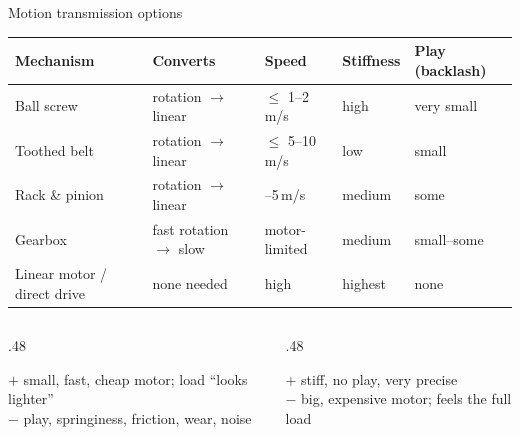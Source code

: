 \documentclass[aspectratio=169,10pt]{beamer}
\begin{document}
\begin{frame}{Motion transmission options}
\centering
\small
\renewcommand{\arraystretch}{1.12}
\begin{tabularx}{\textwidth}{@{}l>{\centering\arraybackslash}X>{\centering\arraybackslash}X>{\centering\arraybackslash}X>{\centering\arraybackslash}X@{}}
\toprule
\textbf{Mechanism} & \textbf{Converts} & \textbf{Speed} & \textbf{Stiffness} & \textbf{Play (backlash)}\\
\midrule
Ball screw & rotation $\to$ linear & $\le$ 1--2\,m/s & \textcolor{mkGreen}{high} & \textcolor{mkGreen}{very small}\\
Toothed belt & rotation $\to$ linear & \textcolor{mkGreen}{$\le$ 5--10\,m/s} & \textcolor{mkRed}{low} & small\\
Rack \& pinion & rotation $\to$ linear & 2--5\,m/s & medium & some\\
Gearbox & fast rotation $\to$ slow & motor-limited & medium & small--some\\
Linear motor / direct drive & none needed & \textcolor{mkGreen}{high} & \textcolor{mkGreen}{highest} & \textcolor{mkGreen}{none}\\
\bottomrule
\end{tabularx}

\vspace{3mm}
\begin{columns}[T]
\begin{column}{.48\textwidth}
\begin{defbox}
\small
$+$ small, fast, cheap motor; load ``looks lighter''\\
$-$ play, springiness, friction, wear, noise
\end{defbox}
\end{column}
\begin{column}{.48\textwidth}
\begin{defbox}
\small
$+$ stiff, no play, very precise\\
$-$ big, expensive motor; feels the full load
\end{defbox}
\end{column}
\end{columns}
\end{frame}
\end{document}
